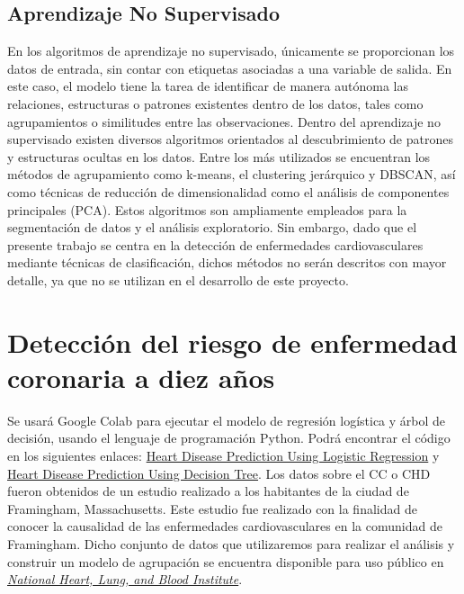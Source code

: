 \documentclass{article}
\begin{document}
    \subsection{Aprendizaje No Supervisado}

    En los algoritmos de aprendizaje no supervisado, únicamente se proporcionan los datos de entrada, sin contar con etiquetas asociadas a una variable de salida. En este caso, el modelo tiene la tarea de identificar de manera autónoma las relaciones, estructuras o patrones existentes dentro de los datos, tales como agrupamientos o similitudes entre las observaciones.
    Dentro del aprendizaje no supervisado existen diversos algoritmos orientados al descubrimiento de patrones y estructuras ocultas en los datos. Entre los más utilizados se encuentran los métodos de agrupamiento como k-means, el clustering jerárquico y DBSCAN, así como técnicas de reducción de dimensionalidad como el análisis de componentes principales (PCA). Estos algoritmos son ampliamente empleados para la segmentación de datos y el análisis exploratorio. Sin embargo, dado que el presente trabajo se centra en la detección de enfermedades cardiovasculares mediante técnicas de clasificación, dichos métodos no serán descritos con mayor detalle, ya que no se utilizan en el desarrollo de este proyecto.

\section{Detección del riesgo de enfermedad coronaria a diez años}

 Se usará Google Colab para ejecutar el modelo de regresión logística y árbol de decisión, usando el lenguaje de programación Python. Podrá encontrar el código en los siguientes enlaces: \href{https://colab.research.google.com/drive/189_8BEiUsl_2C4G_fp8kIsU-RrV1-en2?usp=sharing}{Heart Disease Prediction Using Logistic Regression} y \href{https://colab.research.google.com/drive/1tWzOxwN4WQCwvuAscs4Zvb3vFKrXvqqG?usp=sharing}{Heart Disease Prediction Using Decision Tree}. Los datos sobre el CC o CHD fueron obtenidos de un estudio realizado a los habitantes de la ciudad de Framingham, Massachusetts. Este estudio fue realizado con la finalidad de conocer la causalidad de las enfermedades cardiovasculares en la comunidad de Framingham. Dicho conjunto de datos que utilizaremos para realizar el análisis y construir un modelo de agrupación se encuentra disponible para uso público en \href{https://biolincc.nhlbi.nih.gov/teaching/}{\textit{National Heart, Lung, and Blood Institute}}.
\end{document}
